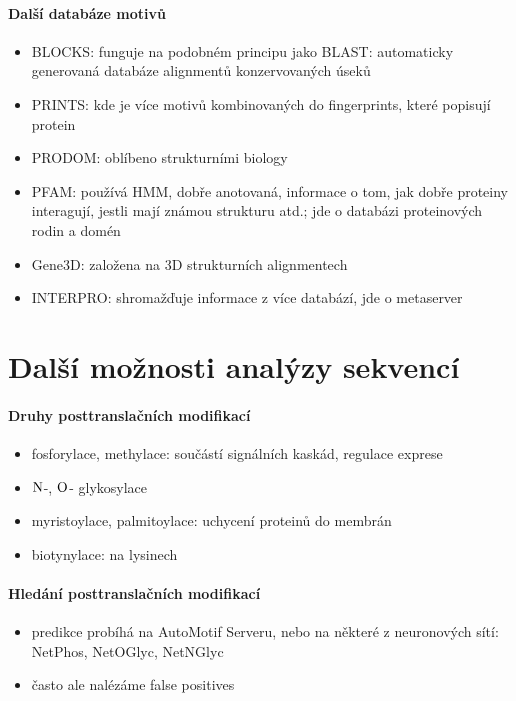 \documentclass[DIV=8]{scrreprt}
\begin{document}
\paragraph{Další databáze motivů}
\begin{itemize}[nosep]
    \item BLOCKS: funguje na podobném principu jako BLAST: automaticky generovaná databáze alignmentů konzervovaných úseků
    \item PRINTS: kde je více motivů kombinovaných do fingerprints, které popisují protein
    \item PRODOM: oblíbeno strukturními biology
    \item PFAM: používá HMM, dobře anotovaná, informace o tom, jak dobře proteiny interagují, jestli mají známou strukturu atd.; jde o databázi proteinových rodin a domén
    \item Gene3D: založena na 3D strukturních alignmentech
    \item INTERPRO: shromažďuje informace z více databází, jde o metaserver
\end{itemize}



\section{Další možnosti analýzy sekvencí} \label{Další možnosti analýzy sekvencí}


\paragraph{Druhy posttranslačních modifikací}
\begin{itemize}[nosep]
    \item fosforylace, methylace: součástí signálních kaskád, regulace exprese
    \item \(\ce{N}\)-, \(\ce{O}\)- glykosylace
    \item myristoylace, palmitoylace: uchycení proteinů do membrán
    \item biotynylace: na lysinech
\end{itemize}



\paragraph{Hledání posttranslačních modifikací}
\begin{itemize}[nosep]
    \item predikce probíhá na AutoMotif Serveru, nebo na některé z neuronových sítí: NetPhos, NetOGlyc, NetNGlyc
    \item často ale nalézáme false positives
\end{itemize}
\end{document}
